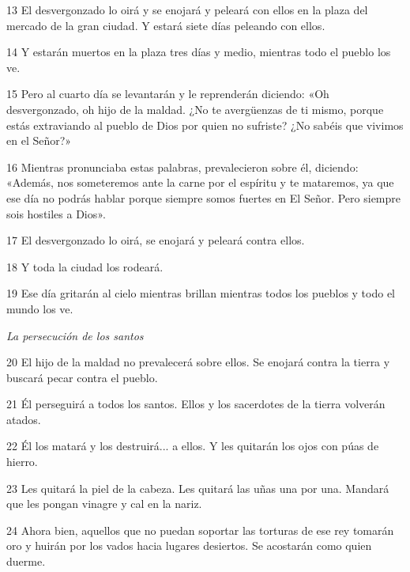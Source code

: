 \par 13 El desvergonzado lo oirá y se enojará y peleará con ellos en la plaza del mercado de la gran ciudad. Y estará siete días peleando con ellos.

\par 14 Y estarán muertos en la plaza tres días y medio, mientras todo el pueblo los ve.

\par 15 Pero al cuarto día se levantarán y le reprenderán diciendo: «Oh desvergonzado, oh hijo de la maldad. ¿No te avergüenzas de ti mismo, porque estás extraviando al pueblo de Dios por quien no sufriste? ¿No sabéis que vivimos en el Señor?»

\par 16 Mientras pronunciaba estas palabras, prevalecieron sobre él, diciendo: «Además, nos someteremos ante la carne por el espíritu y te mataremos, ya que ese día no podrás hablar porque siempre somos fuertes en El Señor. Pero siempre sois hostiles a Dios».

\par 17 El desvergonzado lo oirá, se enojará y peleará contra ellos.

\par 18 Y toda la ciudad los rodeará.

\par 19 Ese día gritarán al cielo mientras brillan mientras todos los pueblos y todo el mundo los ve.


\par \textit{La persecución de los santos}

\par 20 El hijo de la maldad no prevalecerá sobre ellos. Se enojará contra la tierra y buscará pecar contra el pueblo.

\par 21 Él perseguirá a todos los santos. Ellos y los sacerdotes de la tierra volverán atados.

\par 22 Él los matará y los destruirá... a ellos. Y les quitarán los ojos con púas de hierro.

\par 23 Les quitará la piel de la cabeza. Les quitará las uñas una por una. Mandará que les pongan vinagre y cal en la nariz.

\par 24 Ahora bien, aquellos que no puedan soportar las torturas de ese rey tomarán oro y huirán por los vados hacia lugares desiertos. Se acostarán como quien duerme.

